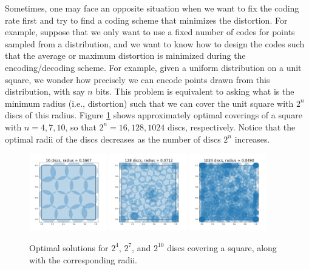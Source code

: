\documentclass[../../book-main.tex]{subfiles}
\begin{document}
\begin{example}\label{example:sphere-covering-rate-distortion}
	Sometimes, one may face an opposite situation when we want to fix the coding rate first and try to find a coding scheme that minimizes the distortion. For example, suppose that we only want to use a fixed number of codes for points sampled from a distribution, and we want to know how to design the codes such that the average or maximum distortion is minimized during the encoding/decoding scheme. For example, given a uniform distribution on a unit square, we wonder how precisely we can encode points drawn from this distribution, with say $n$ bits. This problem is equivalent to asking what is the minimum radius (i.e., distortion) such that we can cover the unit square with $2^n$ discs of this radius. Figure \ref{fig:seven-circles-packing} shows approximately optimal coverings of a square with \(n = 4, 7, 10\), so that \(2^{n} = 16, 128, 1024\) discs, respectively. Notice that the optimal radii of the discs decreases as the number of discs \(2^{n}\) increases.
	\begin{figure}
		\centering
		\includegraphics[width=0.3\textwidth]{chapters/chapter3/figs/sphere_covering_n4.png}
		\hfill
		\includegraphics[width=0.3\textwidth]{chapters/chapter3/figs/sphere_covering_n7.png}
		\hfill
		\includegraphics[width=0.3\textwidth]{chapters/chapter3/figs/sphere_covering_n10.png}

		\caption{Optimal solutions for \(2^{4}\), \(2^{7}\), and \(2^{10}\) discs covering a square, along with the corresponding radii.}
		\label{fig:seven-circles-packing}
	\end{figure}
\end{example}
\end{document}
